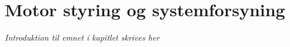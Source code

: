 \chapter{Motor styring og systemforsyning}\label{kap:chap_motor_forsyning}

\emph{Introduktion til emnet i kapitlet skrives her}

